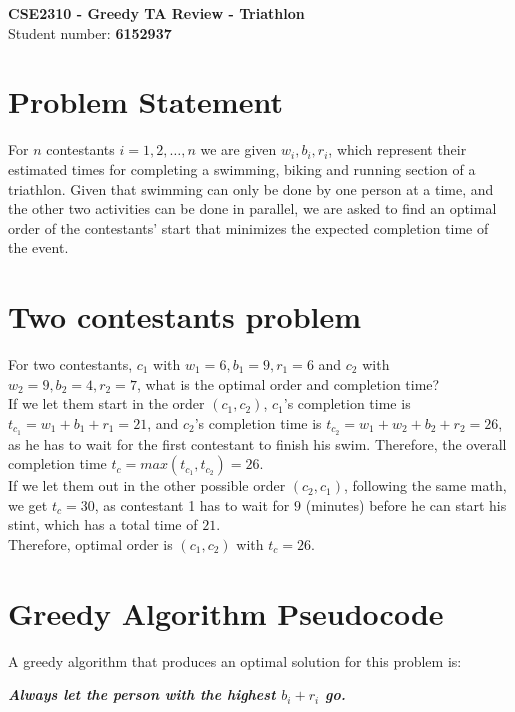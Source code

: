 \documentclass[a4paper,11pt]{article}
\begin{document}
\begin{center}
    {\Large \textbf{CSE2310 - Greedy TA Review - Triathlon}}\\[4pt]
    Student number: \textbf{6152937}
\end{center}

\vspace{1em}

\section*{Problem Statement}
For $n$ contestants $i = 1, 2, \dots , n$ we are given $w_i, b_i, r_i$, which represent their estimated times for completing a swimming, biking and running section of a triathlon. Given that swimming can only be done by one person at a time, and the other two activities can be done in parallel, we are asked to find an optimal order of the contestants' start that minimizes the expected completion time of the event.

\section{Two contestants problem}
For two contestants, $c_1$ with $w_1 = 6, b_1 = 9, r_1 = 6$ and $c_2$ with $w_2 = 9, b_2 = 4, r_2 = 7$, what is the optimal order and completion time?\\
If we let them start in the order $(c_1, c_2)$, $c_1$'s completion time is $t_{c_1} = w_1 + b_1 + r_1 = 21$, and $c_2$'s completion time is $t_{c_2} = w_1 + w_2 + b_2 + r_2 = 26$, as he has to wait for the first contestant to finish his swim. Therefore, the overall completion time $t_c = max(t_{c_1}, t_{c_2}) = 26$.\\
If we let them out in the other possible order $(c_2, c_1)$, following the same math, we get $t_c = 30$, as contestant 1 has to wait for $9$ (minutes) before he can start his stint, which has a total time of $21$.\\
Therefore, optimal order is $(c_1, c_2)$ with $t_c = 26$.

\section{Greedy Algorithm Pseudocode}
A greedy algorithm that produces an optimal solution for this problem is:
\begin{center}
    \textbf{\textit{Always let the person with the highest $b_i + r_i$ go.}}
\end{center}
\end{document}
